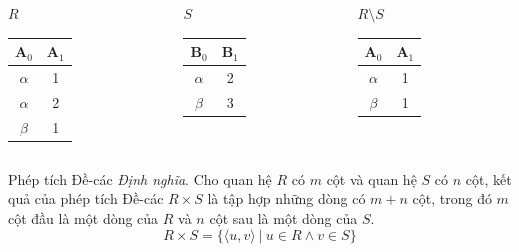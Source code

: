 \documentclass[11pt, handout]{beamer}
\begin{document}
  \begin{frame}
    \begin{columns}[T]
      \begin{column}{0.3\textwidth}
        \centering $R$
        \medskip \\
        \begin{tabular}{|c|c|}
          \hline
          $\textbf{A}_0$ & $\textbf{A}_1$ \\[0.5ex] \hline\hline
          $\alpha$ & 1 \\ \hline
          $\alpha$ & 2 \\ \hline
          $\beta$ & 1 \\ \hline
        \end{tabular}
      \end{column}
      \begin{column}{0.3\textwidth}
        \centering $S$
        \medskip \\
        \begin{tabular}{|c|c|}
          \hline
          $\textbf{B}_0$ & $\textbf{B}_1$ \\[0.5ex] \hline\hline
          $\alpha$ & 2 \\ \hline
          $\beta$ & 3 \\ \hline
        \end{tabular}
      \end{column}
      \begin{column}{0.3\textwidth}
        \centering $R \setminus S$
        \medskip \\
        \begin{tabular}{|c|c|}
          \hline
          $\textbf{A}_0$ & $\textbf{A}_1$ \\[0.5ex] \hline\hline
          $\alpha$ & 1 \\ \hline
          $\beta$ & 1 \\ \hline
        \end{tabular}
      \end{column}
    \end{columns}
  \end{frame}
  \begin{frame}{Phép tích Đề-các}
    \textit{Định nghĩa}. Cho quan hệ $R$ có $m$ cột và quan hệ $S$ có $n$ cột, 
    kết quả của phép tích Đề-các $R \times S$ là tập hợp những dòng có $m + n$ cột, 
    trong đó $m$ cột đầu là một dòng của $R$ và $n$ cột sau là một dòng của $S$.
    $$R \times S = \{\langle u, v\rangle \ |\ u \in R \wedge v \in S\}$$
  \end{frame}
\end{document}
